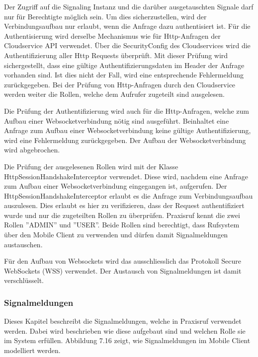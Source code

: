 Der Zugriff auf die Signaling Instanz und die darüber ausgetauschten Signale darf nur für Berechtigte möglich sein.
Um dies sicherzustellen, wird der Verbindungsaufbau nur erlaubt, wenn die Anfrage dazu authentisiert ist.
Für die Authentisierung wird derselbe Mechanismus wie für Http-Anfragen der Cloudservice API verwendet.
Über die SecurityConfig des Cloudservices wird die Authentifizierung aller Http Requests überprüft.
Mit dieser Prüfung wird sichergestellt, dass eine gültige Authentifizierungsdaten im Header der Anfrage vorhanden sind.
Ist dies nicht der Fall, wird eine entsprechende Fehlermeldung zurückgegeben.
Bei der Prüfung von Http-Anfragen durch den Cloudservice werden weiter die Rollen, welche dem Aufrufer zugeteilt sind ausgelesen.

Die Prüfung der Authentifizierung wird auch für die Http-Anfragen, welche zum Aufbau einer Websocketverbindung nötig sind ausgeführt.
Beinhaltet eine Anfrage zum Aufbau einer Websocketverbindung keine gültige Authentifizierung, wird eine Fehlermeldung zurückgegeben.
Der Aufbau der Websocketverbindung wird abgebrochen.

Die Prüfung der ausgelesenen Rollen wird mit der Klasse HttpSessionHandshakeInterceptor verwendet.
Diese wird, nachdem eine Anfrage zum Aufbau einer Websocketverbindung eingegangen ist, aufgerufen.
Der HttpSessionHandshakeInterceptor erlaubt es die Anfrage zum Verbindungsaufbau auszulesen.
Dies erlaubt es hier zu verifizieren, dass der Request authentifiziert wurde und nur die zugeteilten Rollen zu überprüfen.
Praxisruf kennt die zwei Rollen ''ADMIN'' und ''USER''.
Beide Rollen sind berechtigt, dass Rufsystem über den Mobile Client zu verwenden und dürfen damit Signalmeldungen austauschen.

Für den Aufbau von Websockets wird das ausschliesslich das Protokoll Secure WebSockets (WSS) verwendet.
Der Austausch von Signalmeldungen ist damit verschlüsselt.

\clearpage

\subsubsection{Signalmeldungen}

Dieses Kapitel beschreibt die Signalmeldungen, welche in Praxisruf verwendet werden.
Dabei wird beschrieben wie diese aufgebaut sind und welchen Rolle sie im System erfüllen.
Abbildung 7.16 zeigt, wie Signalmeldungen im Mobile Client modelliert werden.

